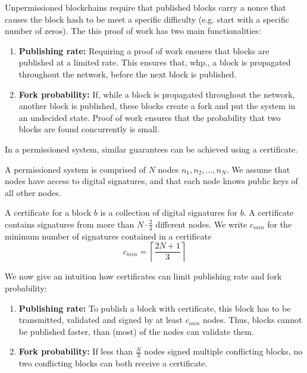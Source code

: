 
\noindent
Unpermissioned blockchains require that published blocks carry a nonce that causes the block hash to be meet a specific difficulty (e.g. start with a specific number of zeros). The this proof of work has two main functionalities:

\begin{enumerate}
	\item \textbf{Publishing rate:} Requiring a proof of work ensures that blocks are published at a limited rate. This ensures that, whp., a block is propagated throughout the network, before the next block is published.
	\item \textbf{Fork probability:} If, while a block is propagated throughout the network, another block is published, these blocks create a fork and put the system in an undecided state. Proof of work ensures that the probability that two blocks are found concurrently is small. 
\end{enumerate}

In a permissioned system, similar guarantees can be achieved using a certificate.

\begin{definition}
	A permissioned system is comprised of $N$ nodes $n_1, n_2, ..., n_N$.
	We assume that nodes have access to digital signatures, and that each node knows public keys of all other nodes.	
\end{definition}

\begin{definition}
A certificate for a block $b$ is a collection of digital signatures for $b$. 
A certificate contains signatures from more than $N\cdot\frac{2}{3}$ different nodes. We write $c_{min}$ for the minimum number of signatures contained in a certificate $$c_{min} = \left\lceil\frac{2N+1}{3}\right\rceil$$
\end{definition}


\begin{idea} We now give an intuition how certificates can limit publishing rate and fork probability:
	\begin{enumerate}
		\item \textbf{Publishing rate:} To publish a block with certificate, this block has to be transmitted, validated and signed by at least $c_{min}$ nodes. Thus, blocks cannot be published faster, than (most) of the nodes can validate them.
		\item \textbf{Fork probability:} If less than $\frac{N}{3}$ nodes signed multiple conflicting blocks, no two conflicting blocks can both receive a certificate.
	\end{enumerate}
\end{idea}
